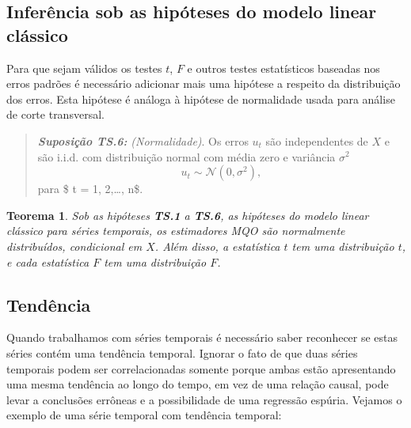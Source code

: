 \documentclass[
]{book}
\newtheorem{theorem}{Teorema}[chapter]
\theoremstyle{definition}
\theoremstyle{definition}
\theoremstyle{definition}
\theoremstyle{remark}
\begin{document}
\hypertarget{inferuxeancia-sob-as-hipuxf3teses-do-modelo-linear-cluxe1ssico}{%
\subsection{Inferência sob as hipóteses do modelo linear clássico}\label{inferuxeancia-sob-as-hipuxf3teses-do-modelo-linear-cluxe1ssico}}

Para que sejam válidos os testes \(t\), \(F\) e outros testes estatísticos baseadas nos erros padrões é necessário adicionar mais uma hipótese a respeito da distribuição dos erros. Esta hipótese é análoga à hipótese de normalidade usada para análise de corte transversal.

\begin{quote}
\textbf{\emph{Suposição TS.6:}} \emph{(Normalidade)}. Os erros \(u_t\) são independentes de \(X\) e são i.i.d. com distribuição normal com média zero e variância \(\sigma^2\)
\[u_t\sim\mathcal{N}(0,\sigma^2),\] para \$ t = 1, 2,\ldots, n\$.
\end{quote}

\begin{theorem}
\protect\hypertarget{thm:teoinfmqo}{}{\label{thm:teoinfmqo} }Sob as hipóteses \textbf{TS.1} a \textbf{TS.6}, as hipóteses do modelo linear clássico para séries temporais, os estimadores MQO são normalmente distribuídos, condicional em \(X\). Além disso, a estatística \(t\) tem uma distribuição \(t\), e cada estatística \(F\) tem uma distribuição \(F\).
\end{theorem}

\hypertarget{tenduxeancia}{%
\subsection{Tendência}\label{tenduxeancia}}

Quando trabalhamos com séries temporais é necessário saber reconhecer se estas séries contém uma tendência temporal. Ignorar o fato de que duas séries temporais podem ser correlacionadas somente porque ambas estão apresentando uma mesma tendência ao longo do tempo, em vez de uma relação causal, pode levar a conclusões errôneas e a possibilidade de uma regressão espúria. Vejamos o exemplo de uma série temporal com tendência temporal:
\end{document}
